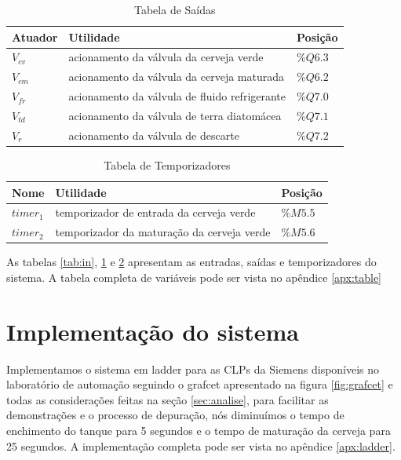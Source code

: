 \documentclass[twoside,twocolumn, 12pt]{paper}
\begin{document}
\begin{table}[b]
	\caption{Tabela de Saídas}
	\label{tab:out}
	\centering
	\begin{tabular}{|  p{2cm} | p{10cm} | p{2cm} | }
		\hline
		Atuador & Utilidade & Posição\\
		\hline
  		$V_{cv}$ & acionamento da válvula da cerveja verde & $\%Q6.3$ \\
  		$V_{cm}$ & acionamento da válvula da cerveja maturada & $\%Q6.2$ \\
 		$V_{fr}$ & acionamento da válvula de fluido refrigerante & $\%Q7.0$ \\
		$V_{td}$ & acionamento da válvula de terra diatomácea & $\%Q7.1$ \\
		$V_r$ & acionamento da válvula de descarte & $\%Q7.2$ \\
 		\hline
	\end{tabular}
\end{table}


\begin{table}[b]
	\caption{Tabela de Temporizadores}
	\label{tab:temp}
	\centering
	\begin{tabular}{|  p{2cm} | p{10cm} | p{2cm} | }
		\hline
		Nome & Utilidade & Posição\\
		\hline
		$timer_1$ &  temporizador de entrada da cerveja verde & $\%M5.5$ \\
		$timer_2$ & temporizador da maturação da cerveja verde & $\%M5.6$ \\
		 \hline
	\end{tabular}
\end{table}

As tabelas \ref{tab:in}, \ref{tab:out} e \ref{tab:temp} apresentam as entradas, saídas e temporizadores do sistema. A tabela completa de variáveis pode ser vista no apêndice \ref{apx:table}

\section {Implementação do sistema}
\label{sec:ladder}
Implementamos o sistema em ladder para as CLPs da Siemens disponíveis no laboratório de automação seguindo o grafcet apresentado na figura \ref{fig:grafcet} e todas as considerações feitas na seção \ref{sec:analise}, para facilitar as demonstrações e o processo de depuração, nós diminuímos o tempo de enchimento do tanque para 5 segundos e o tempo de maturação da cerveja para 25 segundos. A implementação completa pode ser vista no apêndice \ref{apx:ladder}.
\end{document}
